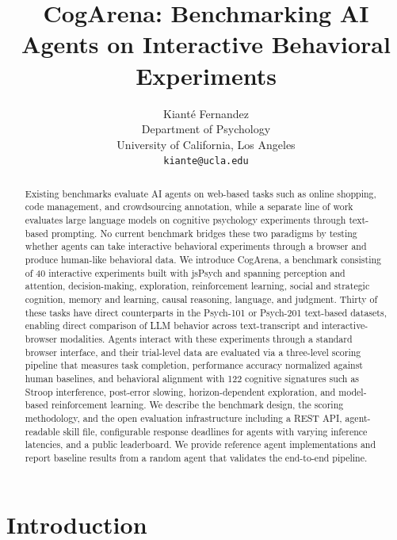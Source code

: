 \documentclass{article}
\title{CogArena: Benchmarking AI Agents on Interactive Behavioral Experiments}
\author{
  Kiant\'{e} Fernandez \\
  Department of Psychology \\
  University of California, Los Angeles \\
  \texttt{kiante@ucla.edu}
}
\begin{document}
\maketitle

\begin{abstract}

Existing benchmarks evaluate AI agents on web-based tasks such as online shopping, code management, and crowdsourcing annotation, while a separate line of work evaluates large language models on cognitive psychology experiments through text-based prompting. No current benchmark bridges these two paradigms by testing whether agents can take interactive behavioral experiments through a browser and produce human-like behavioral data. We introduce CogArena, a benchmark consisting of 40 interactive experiments built with jsPsych and spanning perception and attention, decision-making, exploration, reinforcement learning, social and strategic cognition, memory and learning, causal reasoning, language, and judgment. Thirty of these tasks have direct counterparts in the Psych-101 or Psych-201 text-based datasets, enabling direct comparison of LLM behavior across text-transcript and interactive-browser modalities. Agents interact with these experiments through a standard browser interface, and their trial-level data are evaluated via a three-level scoring pipeline that measures task completion, performance accuracy normalized against human baselines, and behavioral alignment with 122 cognitive signatures such as Stroop interference, post-error slowing, horizon-dependent exploration, and model-based reinforcement learning. We describe the benchmark design, the scoring methodology, and the open evaluation infrastructure including a REST API, agent-readable skill file, configurable response deadlines for agents with varying inference latencies, and a public leaderboard. We provide reference agent implementations and report baseline results from a random agent that validates the end-to-end pipeline.

\end{abstract}

\section{Introduction}
\label{sec:intro}
\end{document}
